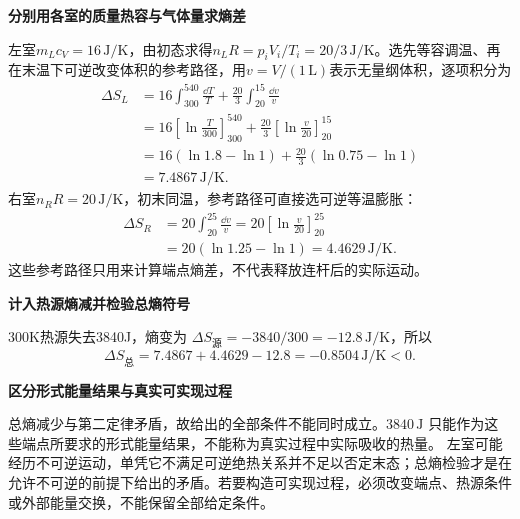\begin{solution}
\par\medskip{}\noindent\textbf{分别用各室的质量热容与气体量求熵差}\par\nobreak
左室$m_Lc_V=16\,\mathrm{J/K}$，由初态求得$n_LR=p_iV_i/T_i=20/3\,\mathrm{J/K}$。选先等容调温、再在末温下可逆改变体积的参考路径，用$v=V/(1\,\mathrm L)$表示无量纲体积，逐项积分为
\[
\begin{aligned}
\Delta S_L
&=16\int_{300}^{540}\frac{\dd T}{T}
+\frac{20}{3}\int_{20}^{15}\frac{\dd v}{v}\\
&=16\left[\ln\frac{T}{300}\right]_{300}^{540}
+\frac{20}{3}\left[\ln\frac v{20}\right]_{20}^{15}\\
&=16(\ln1.8-\ln1)+\frac{20}{3}(\ln0.75-\ln1)\\
&=7.4867\,\mathrm{J/K}.
\end{aligned}
\]
右室$n_RR=20\,\mathrm{J/K}$，初末同温，参考路径可直接选可逆等温膨胀：
\[
\begin{aligned}
\Delta S_R&=20\int_{20}^{25}\frac{\dd v}{v}
=20\left[\ln\frac v{20}\right]_{20}^{25}\\
&=20(\ln1.25-\ln1)=4.4629\,\mathrm{J/K}.
\end{aligned}
\]
这些参考路径只用来计算端点熵差，不代表释放连杆后的实际运动。


\par\medskip{}\noindent\textbf{计入热源熵减并检验总熵符号}\par\nobreak
300K热源失去3840J，熵变为 $\Delta S_{\text{源}}=-3840/300=-12.8\,\mathrm{J/K}$，所以
\[\boxed{\Delta S_{\text{总}}=7.4867+4.4629-12.8=-0.8504\,\mathrm{J/K}<0}.\]


\par\medskip{}\noindent\textbf{区分形式能量结果与真实可实现过程}\par\nobreak
总熵减少与第二定律矛盾，故给出的全部条件不能同时成立。$3840\,\mathrm J$ 只能作为这些端点所要求的形式能量结果，不能称为真实过程中实际吸收的热量。
左室可能经历不可逆运动，单凭它不满足可逆绝热关系并不足以否定末态；总熵检验才是在允许不可逆的前提下给出的矛盾。若要构造可实现过程，必须改变端点、热源条件或外部能量交换，不能保留全部给定条件。
\end{solution}
